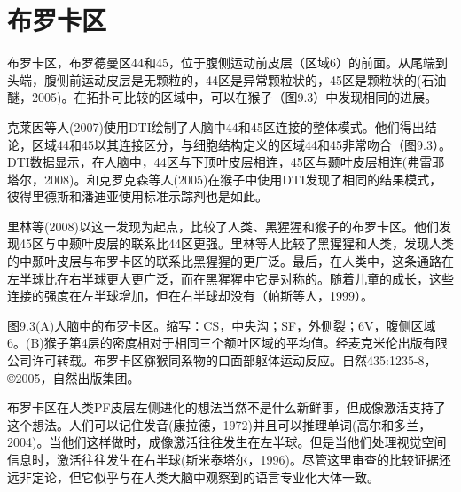 \section{布罗卡区}
布罗卡区，布罗德曼区44和45，位于腹侧运动前皮层（区域6）的前面。从尾端到头端，腹侧前运动皮层是无颗粒的，44区是异常颗粒状的，45区是颗粒状的(石油醚，2005)。在拓扑可比较的区域中，可以在猴子（图9.3）中发现相同的进展。
\par
克莱因等人(2007)使用DTI绘制了人脑中44和45区连接的整体模式。他们得出结论，区域44和45以其连接区分，与细胞结构定义的区域44和45非常吻合（图9.3）。DTI数据显示，在人脑中，44区与下顶叶皮层相连，45区与颞叶皮层相连(弗雷耶塔尔，2008)。和克罗克森等人(2005)在猴子中使用DTI发现了相同的结果模式，彼得里德斯和潘迪亚使用标准示踪剂也是如此。
\par
里林等(2008)以这一发现为起点，比较了人类、黑猩猩和猴子的布罗卡区。他们发现45区与中颞叶皮层的联系比44区更强。里林等人比较了黑猩猩和人类，发现人类的中颞叶皮层与布罗卡区的联系比黑猩猩的更广泛。最后，在人类中，这条通路在左半球比在右半球更大更广泛，而在黑猩猩中它是对称的。随着儿童的成长，这些连接的强度在左半球增加，但在右半球却没有（帕斯等人，1999）。
\par
图9.3(A)人脑中的布罗卡区。缩写：CS，中央沟；SF，外侧裂；6V，腹侧区域6。(B)猴子第4层的密度相对于相同三个额叶区域的平均值。经麦克米伦出版有限公司许可转载。布罗卡区猕猴同系物的口面部躯体运动反应。自然435:1235-8，©2005，自然出版集团。
\par
布罗卡区在人类PF皮层左侧进化的想法当然不是什么新鲜事，但成像激活支持了这个想法。人们可以记住发音(康拉德，1972)并且可以推理单词(高尔和多兰，2004)。当他们这样做时，成像激活往往发生在左半球。但是当他们处理视觉空间信息时，激活往往发生在右半球(斯米泰塔尔，1996)。尽管这里审查的比较证据还远非定论，但它似乎与在人类大脑中观察到的语言专业化大体一致。
